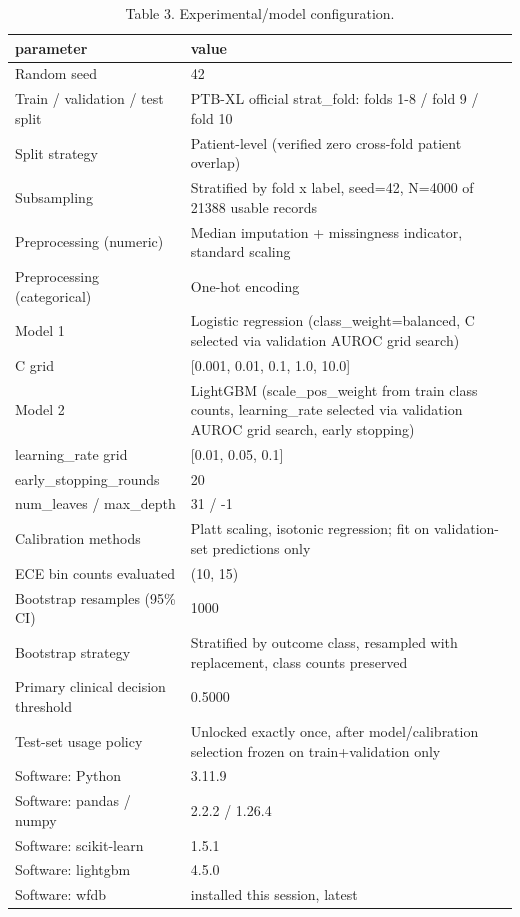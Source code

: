 \begin{table}[htbp]
\centering
\caption{Table 3. Experimental/model configuration.}
\label{table3_experimental_configuration}
\begin{tabular}{ll}
\toprule
parameter & value \\
\midrule
Random seed & 42 \\
Train / validation / test split & PTB-XL official strat\_fold: folds 1-8 / fold 9 / fold 10 \\
Split strategy & Patient-level (verified zero cross-fold patient overlap) \\
Subsampling & Stratified by fold x label, seed=42, N=4000 of 21388 usable records \\
Preprocessing (numeric) & Median imputation + missingness indicator, standard scaling \\
Preprocessing (categorical) & One-hot encoding \\
Model 1 & Logistic regression (class\_weight=balanced, C selected via validation AUROC grid search) \\
  C grid & [0.001, 0.01, 0.1, 1.0, 10.0] \\
Model 2 & LightGBM (scale\_pos\_weight from train class counts, learning\_rate selected via validation AUROC grid search, early stopping) \\
  learning\_rate grid & [0.01, 0.05, 0.1] \\
  early\_stopping\_rounds & 20 \\
  num\_leaves / max\_depth & 31 / -1 \\
Calibration methods & Platt scaling, isotonic regression; fit on validation-set predictions only \\
ECE bin counts evaluated & (10, 15) \\
Bootstrap resamples (95\% CI) & 1000 \\
Bootstrap strategy & Stratified by outcome class, resampled with replacement, class counts preserved \\
Primary clinical decision threshold & 0.5000 \\
Test-set usage policy & Unlocked exactly once, after model/calibration selection frozen on train+validation only \\
Software: Python & 3.11.9 \\
Software: pandas / numpy & 2.2.2 / 1.26.4 \\
Software: scikit-learn & 1.5.1 \\
Software: lightgbm & 4.5.0 \\
Software: wfdb & installed this session, latest \\
\bottomrule
\end{tabular}

\end{table}

